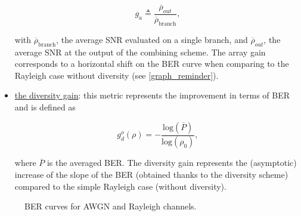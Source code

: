 \documentclass [a4paper, 11pt] {article}
\begin{document}
\begin{reminder}
\begin{itemize}
        \begin{equation}
        g_a \triangleq \frac{\overline{\rho}_{out}}{\overline{\rho}_{\text{branch}}},    
        \end{equation}
        
        with $\overline{\rho}_{\text{branch}}$, the average SNR evaluated on a single branch, and $\overline{\rho}_{out}$, the average SNR at the output of the combining scheme. The array gain corresponds to a horizontal shift on the BER curve when comparing to the Rayleigh case without diversity (see \autoref{graph_reminder}).
        
        \item \underline{the diversity gain}: this metric represents the improvement in terms of BER and is defined as 
        
        \begin{equation}
        g_d^o(\rho) = -\frac{\text{log}(\overline{P})}{\text{log}(\rho_0)},
        \end{equation} 
        
        where $\overline{P}$ is the averaged BER. The diversity gain represents the (asymptotic) increase of the slope of the BER (obtained thanks to the diversity scheme) compared to the simple Rayleigh case (without diversity).
    \end{itemize}
    
    \begin{figure}[H]
        \centering
        \caption{BER curves for AWGN and Rayleigh channels.}
        \label{graph_reminder}
    \end{figure}


\end{reminder}
\end{document}
